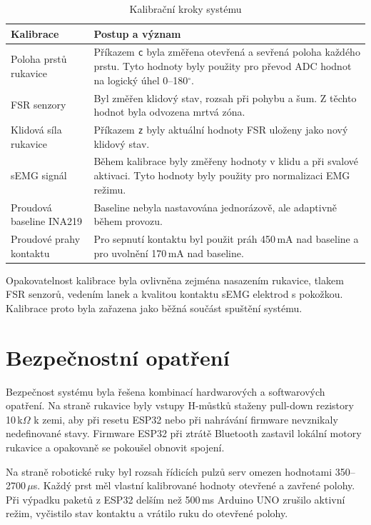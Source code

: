 \begin{table}[H]
\centering
\caption{Kalibrační kroky systému}
\label{tab:kalibrace-systemu}
\begin{tabular}{|p{}|p{}|}
\hline
\textbf{Kalibrace} & \textbf{Postup a význam} \\
\hline
Poloha prstů rukavice & Příkazem \texttt{c} byla změřena otevřená a sevřená poloha každého prstu. Tyto hodnoty byly použity pro převod ADC hodnot na logický úhel 0--180$^\circ$. \\
\hline
FSR senzory & Byl změřen klidový stav, rozsah při pohybu a šum. Z těchto hodnot byla odvozena mrtvá zóna. \\
\hline
Klidová síla rukavice & Příkazem \texttt{z} byly aktuální hodnoty FSR uloženy jako nový klidový stav. \\
\hline
sEMG signál & Během kalibrace byly změřeny hodnoty v klidu a při svalové aktivaci. Tyto hodnoty byly použity pro normalizaci EMG režimu. \\
\hline
Proudová baseline INA219 & Baseline nebyla nastavována jednorázově, ale adaptivně během provozu. \\
\hline
Proudové prahy kontaktu & Pro sepnutí kontaktu byl použit práh 450\,mA nad baseline a pro uvolnění 170\,mA nad baseline. \\
\hline
\end{tabular}
\end{table}

Opakovatelnost kalibrace byla ovlivněna zejména nasazením rukavice, tlakem FSR senzorů, vedením lanek a kvalitou kontaktu sEMG elektrod s pokožkou. Kalibrace proto byla zařazena jako běžná součást spuštění systému.

\section{Bezpečnostní opatření}
\label{sec:bezpecnostni-opatreni}

Bezpečnost systému byla řešena kombinací hardwarových a softwarových opatření. Na straně rukavice byly vstupy H-můstků staženy pull-down rezistory 10\,k$\Omega$ k zemi, aby při resetu ESP32 nebo při nahrávání firmware nevznikaly nedefinované stavy. Firmware ESP32 při ztrátě Bluetooth zastavil lokální motory rukavice a opakovaně se pokoušel obnovit spojení.

Na straně robotické ruky byl rozsah řídicích pulzů serv omezen hodnotami 350--2700\,$\mu$s. Každý prst měl vlastní kalibrované hodnoty otevřené a zavřené polohy. Při výpadku paketů z ESP32 delším než 500\,ms Arduino UNO zrušilo aktivní režim, vyčistilo stav kontaktu a vrátilo ruku do otevřené polohy.

